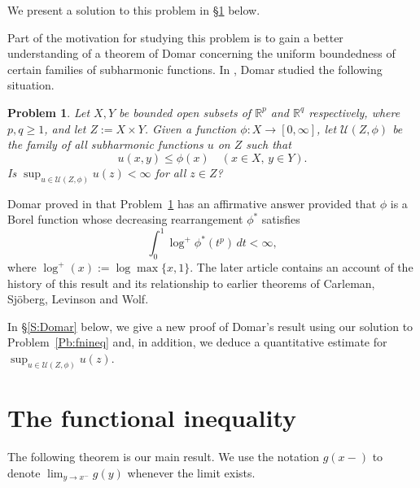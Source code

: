 \documentclass[11pt,reqno]{amsart}
\theoremstyle{plain}
\newtheorem{problem}[theorem]{Problem}
\theoremstyle{definition}
\theoremstyle{remark}
\newcommand{\cU}{\mathcal{U}}
\newcommand{\RR}{\mathbb{R}}
\begin{document}
We present a  solution to this problem 
in \S\ref{S:fnineq} below.

Part of the motivation for studying this problem is
to gain a better understanding of a theorem of
Domar concerning the uniform boundedness of 
certain families of subharmonic functions.
In \cite[\S3]{Do57}, Domar studied the following situation.

\begin{problem}\label{Pb:Domar}
Let $X,Y$ be bounded open
subsets of $\RR^p$ and $\RR^q$ respectively, 
where $p,q\ge1$, and let $Z:=X\times Y$.
Given a  function $\phi:X\to[0,\infty]$, 
 let $\cU(Z,\phi)$ be the family
of all subharmonic functions $u$ on $Z$ such that
\[
u(x,y)\le \phi(x) \quad(x\in X,\,y\in Y).
\]
Is $\sup_{u\in\cU(Z,\phi)}u(z)<\infty$ for all $z\in Z$?
\end{problem}

Domar proved in \cite[Theorem~3]{Do57} that Problem~\ref{Pb:Domar}
has an affirmative answer provided that
$\phi$ is a Borel function whose decreasing rearrangement $\phi^*$
satisfies
\begin{equation}\label{E:Domarcond}
\int_0^1 \log^+\phi^*(t^p)\,dt<\infty,
\end{equation}
where $\log^+(x):=\log\max\{x,1\}$.
The later article \cite{Do88} contains an account of the 
history of this result and its relationship to earlier
theorems of Carleman, Sj\"oberg, Levinson and Wolf.


In \S\ref{S:Domar} below, 
we give a new proof of Domar's result using our 
solution to Problem~\ref{Pb:fnineq} and, 
in addition, we deduce a quantitative estimate for
$\sup_{u\in\cU(Z,\phi)}u(z)$. 


\section{The functional inequality}\label{S:fnineq}

The following theorem is our main result.
We use the notation $g(x-)$ to denote $\lim_{y\to x^-}g(y)$ whenever the limit exists.
\end{document}
